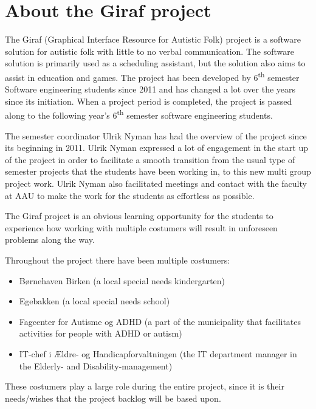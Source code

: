 \section{About the Giraf project}
The Giraf (Graphical Interface Resource for Autistic Folk) project is a software solution for autistic folk with little to no verbal communication.
The software solution is primarily used as a scheduling assistant, but the solution also aims to assist in education and games.
The project has been developed by 6\textsuperscript{th} semester Software engineering students since 2011 and has changed a lot over the years since its initiation.
When a project period is completed, the project is passed along to the following year's 6\textsuperscript{th} semester software engineering students.

The semester coordinator Ulrik Nyman has had the overview of the project since its beginning in 2011.
Ulrik Nyman expressed a lot of engagement in the start up of the project in order to facilitate a smooth transition from the usual type of semester projects that the students have been working in, to this new multi group project work.
Ulrik Nyman also facilitated meetings and contact with the faculty at AAU to make the work for the students as effortless as possible.

The Giraf project is an obvious learning opportunity for the students to experience how working with multiple costumers will result in unforeseen problems along the way.

Throughout the project there have been multiple costumers:

\begin{itemize}
	\item Børnehaven Birken (a local special needs kindergarten)
	\item Egebakken (a local special needs school)
	\item Fagcenter for Autisme og ADHD (a part of the municipality that facilitates activities for people with ADHD or autism)
	\item IT-chef i Ældre- og Handicapforvaltningen (the IT department manager in the Elderly- and Disability-management)
\end{itemize}

These costumers play a large role during the entire project, since it is their needs/wishes that the project backlog will be based upon.
